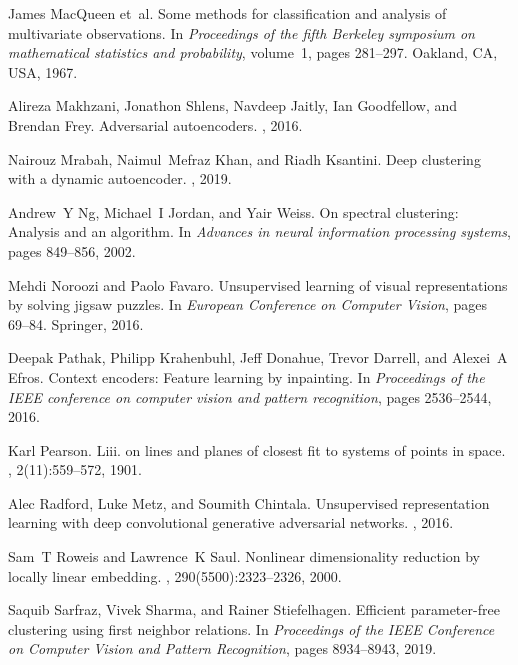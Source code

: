 \documentclass{article}
\begin{document}
\begin{thebibliography}{10}
James MacQueen et~al.
\newblock Some methods for classification and analysis of multivariate
  observations.
\newblock In {\em Proceedings of the fifth Berkeley symposium on mathematical
  statistics and probability}, volume~1, pages 281--297. Oakland, CA, USA,
  1967.

Alireza Makhzani, Jonathon Shlens, Navdeep Jaitly, Ian Goodfellow, and Brendan
  Frey.
\newblock Adversarial autoencoders.
,
  2016.

Nairouz Mrabah, Naimul~Mefraz Khan, and Riadh Ksantini.
\newblock Deep clustering with a dynamic autoencoder.
, 2019.

Andrew~Y Ng, Michael~I Jordan, and Yair Weiss.
\newblock On spectral clustering: Analysis and an algorithm.
\newblock In {\em Advances in neural information processing systems}, pages
  849--856, 2002.

Mehdi Noroozi and Paolo Favaro.
\newblock Unsupervised learning of visual representations by solving jigsaw
  puzzles.
\newblock In {\em European Conference on Computer Vision}, pages 69--84.
  Springer, 2016.

Deepak Pathak, Philipp Krahenbuhl, Jeff Donahue, Trevor Darrell, and Alexei~A
  Efros.
\newblock Context encoders: Feature learning by inpainting.
\newblock In {\em Proceedings of the IEEE conference on computer vision and
  pattern recognition}, pages 2536--2544, 2016.

Karl Pearson.
\newblock Liii. on lines and planes of closest fit to systems of points in
  space.
, 2(11):559--572, 1901.

Alec Radford, Luke Metz, and Soumith Chintala.
\newblock Unsupervised representation learning with deep convolutional
  generative adversarial networks.
,
  2016.

Sam~T Roweis and Lawrence~K Saul.
\newblock Nonlinear dimensionality reduction by locally linear embedding.
, 290(5500):2323--2326, 2000.

Saquib Sarfraz, Vivek Sharma, and Rainer Stiefelhagen.
\newblock Efficient parameter-free clustering using first neighbor relations.
\newblock In {\em Proceedings of the IEEE Conference on Computer Vision and
  Pattern Recognition}, pages 8934--8943, 2019.


\end{thebibliography}
\end{document}
